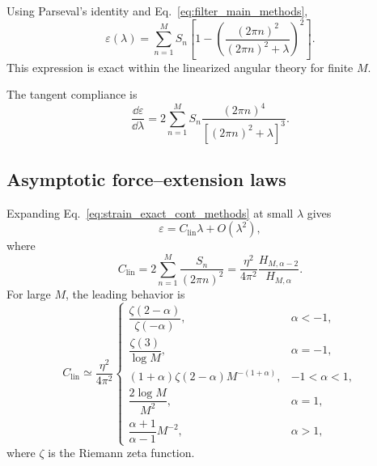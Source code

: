 \documentclass[pdflatex, twocolumn, sn-nature]{sn-jnl}
\begin{document}
Using Parseval's identity and Eq.~\eqref{eq:filter_main_methods},
\begin{equation}
\varepsilon(\lambda)
=
\sum_{n=1}^{M}
S_n
\left[
1-
\left(
\frac{(2\pi n)^2}
{(2\pi n)^2+\lambda}
\right)^2
\right].
\label{eq:strain_exact_cont_methods}
\end{equation}
This expression is exact within the linearized angular theory for finite $M$.

The tangent compliance is
\begin{equation}
\frac{\dd\varepsilon}{\dd\lambda}
=
2
\sum_{n=1}^{M}
S_n
\frac{(2\pi n)^4}
{\left[(2\pi n)^2+\lambda\right]^3}.
\label{eq:compliance_methods}
\end{equation}

\subsection*{Asymptotic force--extension laws}
\label{sec:asymptotics_methods}


Expanding Eq.~\eqref{eq:strain_exact_cont_methods} at small $\lambda$ gives
\begin{equation}
\varepsilon
=
C_{\mathrm{lin}}\lambda
+
O(\lambda^2),
\end{equation}
where
\begin{equation}
C_{\mathrm{lin}}
=
2\sum_{n=1}^{M}
\frac{S_n}{(2\pi n)^2}
=
\frac{\eta^2}{4\pi^2}
\frac{H_{M,\alpha-2}}
{H_{M,\alpha}}.
\label{eq:Clin_methods}
\end{equation}
For large $M$, the leading behavior is
\begin{equation}
C_{\mathrm{lin}}
\simeq
\frac{\eta^2}{4\pi^2}
\begin{cases}
\dfrac{\zeta(2-\alpha)}{\zeta(-\alpha)},
& \alpha<-1,\\[3mm]
\dfrac{\zeta(3)}{\log M},
& \alpha=-1,\\[3mm]
(1+\alpha)\zeta(2-\alpha)M^{-(1+\alpha)},
& -1<\alpha<1,\\[2mm]
\dfrac{2\log M}{M^2},
& \alpha=1,\\[3mm]
\dfrac{\alpha+1}{\alpha-1}M^{-2},
& \alpha>1,
\end{cases}
\label{eq:Clin_cases_methods}
\end{equation}
where $\zeta$ is the Riemann zeta function.
\end{document}
